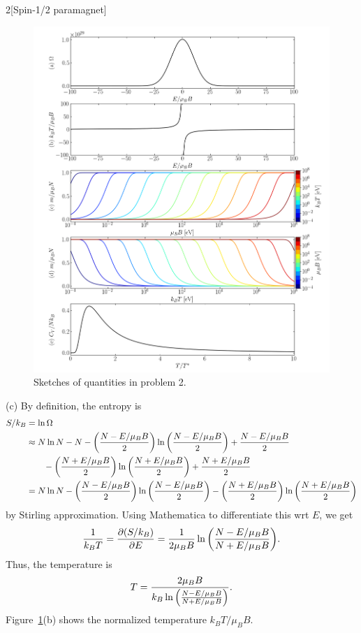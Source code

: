 \documentclass[12pt]{article}
\begin{document}
\begin{problem}{2}[Spin-1/2 paramagnet]
\begin{solution}
\begin{figure}[hbtp]
    \centering
    \includegraphics[width=\textwidth]{p2.png}
    \caption{Sketches of quantities in problem 2.}
    \label{fig:p2}
\end{figure}

(c) By definition, the entropy is
\begin{align}
    S/k_B
    &=\ln\Omega\notag\\
    &\approx N\ln N-N-\qty(\frac{N-E/\mu_BB}{2})\ln\qty(\frac{N-E/\mu_BB}{2})
    +\frac{N-E/\mu_BB}{2}\notag\\
    &\qquad-\qty(\frac{N+E/\mu_BB}{2})\ln\qty(\frac{N+E/\mu_BB}{2})
    +\frac{N+E/\mu_BB}{2}\notag\\
    &=N\ln N-\qty(\frac{N-E/\mu_BB}{2})\ln\qty(\frac{N-E/\mu_BB}{2})
    -\qty(\frac{N+E/\mu_BB}{2})\ln\qty(\frac{N+E/\mu_BB}{2})
\end{align}
by Stirling approximation. Using Mathematica to differentiate this wrt $E$, we
get
\begin{equation}
    \frac1{k_BT}=\frac{\partial(S/k_B)}{\partial E}=\frac1{2\mu_BB}
    \ln\qty(\frac{N-E/\mu_BB}{N+E/\mu_BB}).
\end{equation}
Thus, the temperature is
\begin{equation}\label{p2c:T}
    T=\frac{2\mu_BB}{k_B\ln\qty(\frac{N-E/\mu_BB}{N+E/\mu_BB})}.
\end{equation}
Figure~\ref{fig:p2}(b) shows the normalized temperature $k_BT/\mu_BB$.


\end{solution}
\end{problem}
\end{document}
